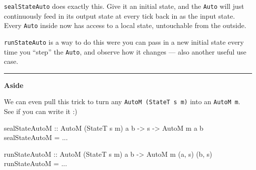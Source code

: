 \documentclass[]{article}
\newenvironment{Shaded}{}{}
\newcommand{\CommentTok}[1]{\textcolor[rgb]{0.38,0.63,0.69}{\textit{#1}}}
\newcommand{\DataTypeTok}[1]{\textcolor[rgb]{0.56,0.13,0.00}{#1}}
\newcommand{\KeywordTok}[1]{\textcolor[rgb]{0.00,0.44,0.13}{\textbf{#1}}}
\newcommand{\NormalTok}[1]{#1}
\newcommand{\OperatorTok}[1]{\textcolor[rgb]{0.40,0.40,0.40}{#1}}
\newcommand{\OtherTok}[1]{\textcolor[rgb]{0.00,0.44,0.13}{#1}}
\begin{document}
\begin{Shaded}
\end{Shaded}

\texttt{sealStateAuto} does exactly this. Give it an initial state, and the
\texttt{Auto} will just continuously feed in its output state at every tick back
in as the input state. Every \texttt{Auto} inside now has access to a local
state, untouchable from the outside.

\texttt{runStateAuto} is a way to do this were you can pass in a new initial
state every time you ``step'' the \texttt{Auto}, and observe how it changes ---
also another useful use case.

\begin{center}\rule{0.5\linewidth}{0.5pt}\end{center}

\textbf{Aside}

We can even pull this trick to turn any \texttt{AutoM\ (StateT\ s\ m)} into an
\texttt{AutoM\ m}. See if you can write it :)

\begin{Shaded}
\begin{Highlighting}[]
\OtherTok{sealStateAutoM ::} \DataTypeTok{AutoM}\NormalTok{ (}\DataTypeTok{StateT}\NormalTok{ s m) a b }\OtherTok{{-}\textgreater{}}\NormalTok{ s }\OtherTok{{-}\textgreater{}} \DataTypeTok{AutoM}\NormalTok{ m a b}
\NormalTok{sealStateAutoM }\OtherTok{=} \OperatorTok{...}

\OtherTok{runStateAutoM ::} \DataTypeTok{AutoM}\NormalTok{ (}\DataTypeTok{StateT}\NormalTok{ s m) a b }\OtherTok{{-}\textgreater{}} \DataTypeTok{AutoM}\NormalTok{ m (a, s) (b, s)}
\NormalTok{runStateAutoM }\OtherTok{=} \OperatorTok{...}
\end{Highlighting}
\end{Shaded}
\end{document}
